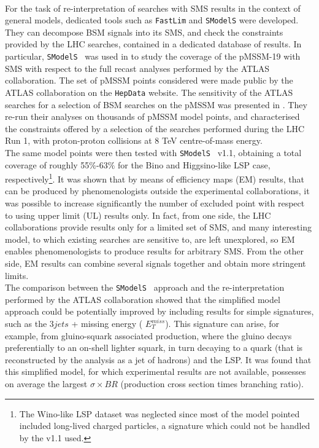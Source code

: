 \documentclass[a4paper,11pt]{article}
\newcommand{\MET}{{ $E_T ^{miss}$}}
\newcommand{\SMO}{\texttt{SModelS\xspace}}
\newcommand{\FASTLIM}{\texttt{FastLim}}
\begin{document}
\\
%
%
%
For the task of re-interpretation of searches with SMS results in the context of general models, dedicated tools such as \FASTLIM \cite{Papucci:2014rja} and \SMO \cite{Kraml:2014sna} were developed. They can decompose BSM signals into its SMS, and check the constraints provided by the LHC searches, contained in a dedicated database of results. In particular, \SMO~ was used in \cite{Ambrogi:2017lov} to study the coverage of the pMSSM-19\cite{Djouadi:1998di} with SMS with respect to the full recast analyses performed by the ATLAS collaboration. The set of pMSSM points considered were made public by the ATLAS collaboration on the \texttt{HepData} website\cite{ATLASpMSSMhepdata}. The sensitivity of the ATLAS searches for a selection of BSM searches on the pMSSM was presented in \cite{Aad:2015baa}. They re-run their analyses on thousands of pMSSM model points, and characterised the constraints offered by a selection of the searches performed during the LHC Run 1, with proton-proton collisions at 8 TeV centre-of-mass energy.
%
\\
The same model points were then tested with \SMO~ v1.1\cite{Ambrogi:2017neo}, obtaining a total coverage of roughly 55$\%$-63$\%$ for the Bino and Higgsino-like LSP case, respectively\footnote{The Wino-like LSP dataset was neglected since most of the model pointed included long-lived charged particles, a signature which could not be handled by the v1.1 used.}. It was shown that by means of efficiency maps (EM) results, that can be produced by phenomenologists outside the experimental collaborations, it was possible to increase significantly the number of excluded point with respect to using upper limit (UL) results only. In fact, from one side, the LHC collaborations provide results only for a limited set of SMS, and many interesting model, to which existing searches are sensitive to, are left unexplored, so EM enables phenomenologists to produce results for arbitrary SMS. From the other side, EM results can combine several signals together and obtain more stringent limits.  
\\
The comparison between the \SMO~ approach and the re-interpretation performed by the ATLAS collaboration showed  that the simplified model approach could be potentially improved by including results for simple signatures, such as the $3jets$ + missing energy (\MET).
This signature can arise, for example, from gluino-squark associated production, where the gluino decays preferentially to an on-shell lighter squark, in turn decaying to a quark (that is reconstructed by the analysis as a jet of hadrons) and the LSP. It was found that this simplified model, for which experimental results are not available, possesses on average the largest $\sigma \times BR$ (production cross section  times branching ratio).
\end{document}
